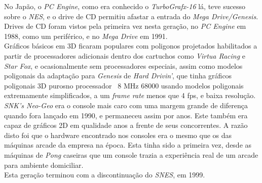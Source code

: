 \documentclass[paper=a4, fontsize=11pt]{scrartcl}	%
\numberwithin{equation}{section}															%
\numberwithin{figure}{section}																%
\numberwithin{table}{section}																%
\begin{document}
No Japão, o \textit{PC Engine}, como era conhecido o \textit{TurboGrafx-16} lá, teve sucesso sobre o \textit{NES}, e o drive de CD permitiu afastar a entrada do \textit{Mega Drive/Genesis}. \\
Drives de CD foram vistos pela primeira vez nesta geração, no \textit{PC Engine} em 1988, como um periférico, e no \textit{Mega Drive} em 1991.\\
Gráficos básicos em 3D ficaram populares com poligonos projetados habilitados a partir de processadores adicionais dentro dos cartuchos como \textit{Virtua Racing} e \textit{Star Fox}, e ocasionalmente sem processadores especiais, assim como modelos poligonais da adaptação para \textit{Genesis} de \textit{Hard Drivin'}, que tinha gráficos poligonais 3D purosno processador  ~8 MHz 68000 usando modelos poligonais extremamente simplificados, a um \textit{frame rate} menos que 4 fps, e baixa resolução.\\
\textit{SNK's Neo-Geo} era o console mais caro com uma margem grande de diferença quando fora lançado em 1990, e permaneceu assim por anos. Este também era capaz de gráficos 2D em qualidade anos a frente de seus concorrentes. A razão disto foi que o hardware encontrado nos consoles era o mesmo que os das máquinas arcade da empresa na época. Esta tinha sido a primeira vez, desde as máquinas de \textit{Pong} caseiras que um console trazia a experiência real de um arcade para ambiente domiciliar.\\
Esta geração terminou com a discontinuação do \textit{SNES}, em 1999.
\end{document}
